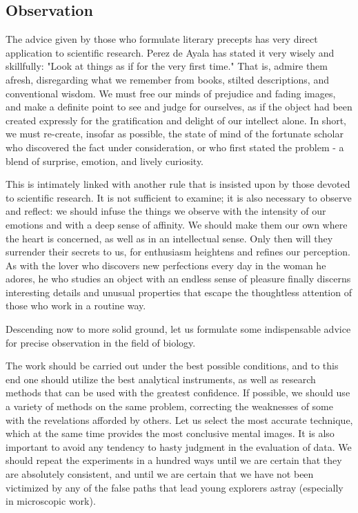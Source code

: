 \documentclass{article}
\begin{document}
\subsection*{Observation}

The advice given by those who formulate literary precepts has very direct application to scientific research. Perez de Ayala has stated it very wisely and skillfully: "Look at things as if for the very first time." That is, admire them afresh, disregarding what we remember from books, stilted descriptions, and conventional wisdom. We must free our minds of prejudice and fading images, and make a definite point to see and judge for ourselves, as if the object had been created expressly for the gratification and delight of our intellect alone. In short, we must re-create, insofar as possible, the state of mind of the fortunate scholar who discovered the fact under consideration, or who first stated the problem - a blend of surprise, emotion, and lively curiosity.

This is intimately linked with another rule that is insisted upon by those devoted to scientific research. It is not sufficient to examine; it is also necessary to observe and reflect: we should infuse the things we observe with the intensity of our emotions and with a deep sense of affinity. We should make them our own where the heart is concerned, as well as in an intellectual sense. Only then will they surrender their secrets to us, for enthusiasm heightens and refines our perception. As with the lover who discovers new perfections every day in the woman he adores, he who studies an object with an endless sense of pleasure finally discerns interesting details and unusual properties that escape the thoughtless attention of those who work in a routine way.

Descending now to more solid ground, let us formulate some indispensable advice for precise observation in the field of biology.

The work should be carried out under the best possible conditions, and to this end one should utilize the best analytical instruments, as well as research methods that can be used with the greatest confidence. If possible, we should use a variety of methods on the same problem, correcting the weaknesses of some with the revelations afforded by others. Let us select the most accurate technique, which at the same time provides the most conclusive mental images. It is also important to avoid any tendency to hasty judgment in the evaluation of data. We should repeat the experiments in a hundred ways until we are certain that they are absolutely consistent, and until we are certain that we have not been victimized by any of the false paths that lead young explorers astray (especially in microscopic work).
\end{document}
